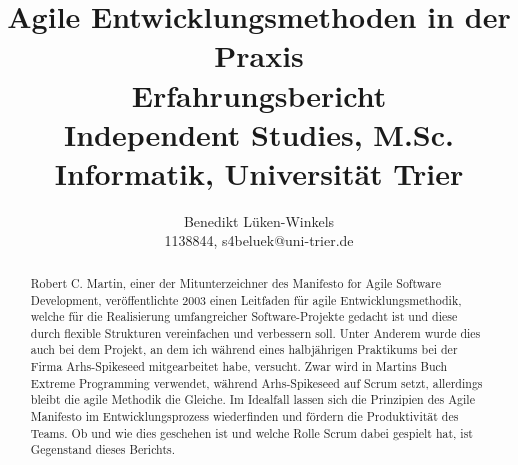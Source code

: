 \documentclass[ngerman]{scrartcl}
\title{Agile Entwicklungsmethoden in der Praxis\\{\small Erfahrungsbericht \\ Independent Studies, M.Sc. Informatik, Universität Trier}}
\author{Benedikt Lüken-Winkels\\{\small 1138844, s4beluek@uni-trier.de}}
\begin{document}
\nocite{*}

\maketitle
\begin{abstract}
Robert C. Martin, einer der Mitunterzeichner des Manifesto for Agile Software Development\cite{2001mfasd}, veröffentlichte 2003 einen Leitfaden für agile Entwicklungsmethodik, welche für die Realisierung umfangreicher Software-Projekte gedacht ist und diese durch flexible Strukturen vereinfachen und verbessern soll. Unter Anderem wurde dies auch bei dem Projekt, an dem ich während eines halbjährigen Praktikums bei der Firma Arhs-Spikeseed mitgearbeitet habe, versucht. Zwar wird in Martins Buch Extreme Programming verwendet, während Arhs-Spikeseed auf Scrum setzt, allerdings bleibt die agile Methodik die Gleiche. Im Idealfall lassen sich die Prinzipien des Agile Manifesto im Entwicklungsprozess wiederfinden und fördern die Produktivität des Teams. Ob und wie dies geschehen ist und welche Rolle Scrum dabei gespielt hat, ist Gegenstand dieses Berichts. 
\end{abstract}
\newpage
\end{document}
